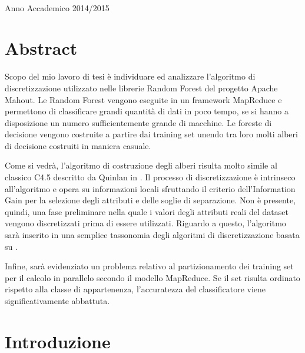 \documentclass[a4paper,11pt,twoside,openright,fleqn]{book}
\begin{document}
\begin{titlepage}
\vspace{3cm}

\vspace{0.2cm}\\
Anno Accademico 2014/2015
\end{titlepage}
\restoregeometry

\setlength{\parskip}{1ex plus 0.3ex minus 0.2ex}

\chapter*{Abstract}

Scopo del mio lavoro di tesi è individuare ed analizzare l'algoritmo di discretizzazione utilizzato nelle librerie Random Forest del progetto Apache Mahout. Le Random Forest vengono eseguite in un framework MapReduce e permettono di classificare grandi quantità di dati in poco tempo, se si hanno a disposizione un numero sufficientemente grande di macchine. Le foreste di decisione vengono costruite a partire dai training set unendo tra loro molti alberi di decisione costruiti in maniera casuale.

Come si vedrà, l'algoritmo di costruzione degli alberi risulta molto simile al classico C4.5 descritto da Quinlan in \cite{Quinlan:1993}. Il processo di discretizzazione è intrinseco all'algoritmo e opera su informazioni locali sfruttando il criterio dell'Information Gain per la selezione degli attributi e delle soglie di separazione. Non è presente, quindi, una fase preliminare nella quale i valori degli attributi reali del dataset vengono discretizzati prima di essere utilizzati. Riguardo a questo, l'algoritmo sarà inserito in una semplice tassonomia degli algoritmi di discretizzazione basata su \cite{Garcia:2013}.

Infine, sarà evidenziato un problema relativo al partizionamento dei training set per il calcolo in parallelo secondo il modello MapReduce. Se il set risulta ordinato rispetto alla classe di appartenenza, l'accuratezza del classificatore viene significativamente abbattuta.

\setlength{\parskip}{3pt}

\tableofcontents

\setlength{\parskip}{1ex plus 0.3ex minus 0.2ex}

\chapter{Introduzione}
\end{document}
